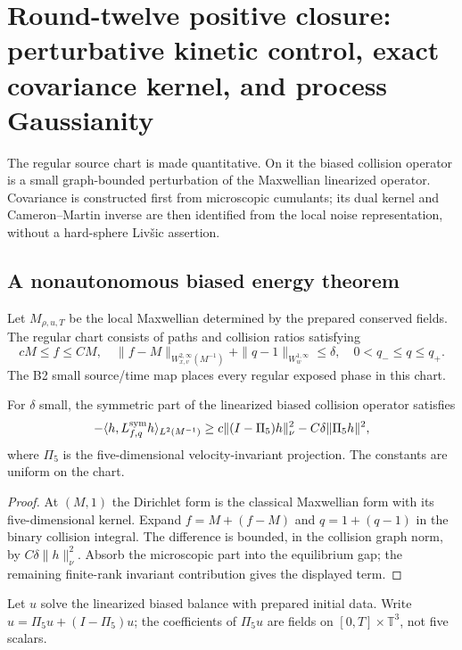 \section{Round-twelve positive closure: perturbative kinetic control, exact covariance kernel, and process Gaussianity}
\label{sec:r12-b3}

The regular source chart is made quantitative.  On it the biased collision
operator is a small graph-bounded perturbation of the Maxwellian linearized
operator.  Covariance is constructed first from microscopic cumulants; its
dual kernel and Cameron--Martin inverse are then identified from the local
noise representation, without a hard-sphere Liv\v{s}ic assertion.

\subsection{A nonautonomous biased energy theorem}

Let $M_{\rho,u,T}$ be the local Maxwellian determined by the prepared conserved
fields.  The regular chart consists of paths and collision ratios satisfying
\[
 cM\le f\le CM,
 \quad
 \|f-M\|_{W^{2,\infty}_{x,v}(M^{-1})}
 +\|q-1\|_{W^{1,\infty}_w}\le\delta,
 \quad 0<q_-\le q\le q_+.
\]
The B2 small source/time map places every regular exposed phase in this chart.

\begin{lemma}
\label{lem:r12-b3-gap}
For $\delta$ small, the symmetric part of the linearized biased collision
operator satisfies
\[
 -\langle h,L^{\rm sym}_{f,q}h\rangle_{L^2(M^{-1})}
 \ge c\|(I-\Pi_5)h\|_\nu^2-C\delta\|\Pi_5h\|^2,
\]
where $\Pi_5$ is the five-dimensional velocity-invariant projection.  The
constants are uniform on the chart.
\end{lemma}

\begin{proof}
At $(M,1)$ the Dirichlet form is the classical Maxwellian form with its
five-dimensional kernel.  Expand $f=M+(f-M)$ and $q=1+(q-1)$ in the binary
collision integral.  The difference is bounded, in the collision graph norm,
by $C\delta\|h\|_\nu^2$.  Absorb the microscopic part into the equilibrium
gap; the remaining finite-rank invariant contribution gives the displayed
term.
\end{proof}

Let $u$ solve the linearized biased balance with prepared initial data.  Write
$u=\Pi_5u+(I-\Pi_5)u$; the coefficients of $\Pi_5u$ are fields on
$[0,T]\times\mathbb T^3$, not five scalars.

